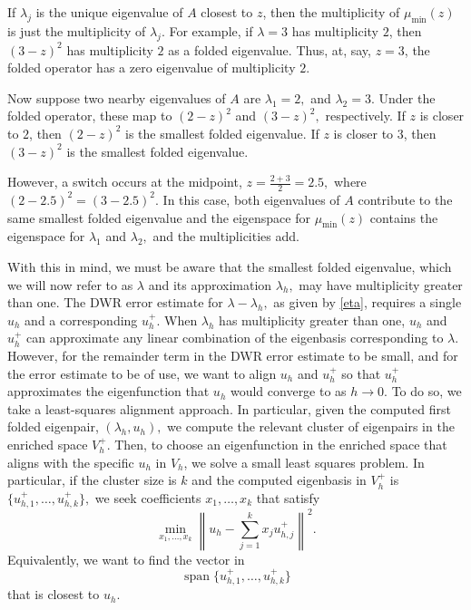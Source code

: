 \documentclass[12pt,a4paper]{article}
\theoremstyle{boldthm}
\theoremstyle{bolddefn}
\begin{document}
If $\lambda_j$ is the unique eigenvalue of $A$ closest to $z$, then the
multiplicity of $\mu_{\min}(z)$ is just the multiplicity of $\lambda_j$.
For example, if $\lambda=3$ has multiplicity $2$, then $(3-z)^2$
has multiplicity $2$ as a folded eigenvalue. Thus, at, say, $z=3$, the
folded operator has a zero eigenvalue of multiplicity $2$.

Now suppose two nearby eigenvalues of $A$ are $\lambda_1=2,$ and $\lambda_2 = 3.$
Under the folded operator, these map to $(2-z)^2$ and $(3-z)^2,$ respectively.
If $z$ is closer to $2$, then $(2-z)^2$ is the smallest folded eigenvalue. If
$z$ is closer to $3$, then $(3-z)^2$ is the smallest folded eigenvalue.

However, a switch occurs at the midpoint, $z = \frac{2+3}{2} = 2.5,$ where
$(2-2.5)^2 = (3-2.5)^2.$
In this case, both eigenvalues of $A$ contribute to the same smallest folded eigenvalue and the eigenspace for $\mu_{\min}(z)$ contains the eigenspace for $\lambda_1$ and $\lambda_2,$ and the multiplicities add.

With this in mind, we must be aware that the smallest folded eigenvalue, which we will now refer to as $\lambda$ and its approximation $\lambda_h,$ may have multiplicity greater than one. The DWR error estimate for $\lambda - \lambda_h,$ as given by \eqref{eta}, requires a single $u_h$ and a corresponding $u_h^+.$ When $\lambda_h$ has multiplicity greater than one, $u_h$ and $u_h^+$ can approximate any linear combination of the eigenbasis corresponding to $\lambda.$ However, for the remainder term in the DWR error estimate to be small, and for the error estimate to be of use, we want to align $u_h$ and $u_h^+$ so that $u_h^+$ approximates the eigenfunction that $u_h$ would converge to as $h\rightarrow 0.$ To do so, we take a least-squares alignment approach. In particular, given the computed first folded eigenpair, $(\lambda_h, u_h),$ we compute the relevant cluster of eigenpairs in the enriched space $V_h^+.$ Then, to choose an eigenfunction in the enriched space that aligns with the specific $u_h$ in $V_h$, we solve a small least squares problem. In particular, if the cluster size is $k$ and the computed eigenbasis in $V_h^+$ is $\{u^+_{h,1},\ldots,u^+_{h,k}\},$ we seek coefficients \(x_1,\ldots,x_k\) that satisfy
\begin{equation}
    \min_{x_1,\ldots,x_k}
    \left\| u_h - \sum_{j=1}^k x_j u^+_{h,j} \right\|^2.
\end{equation}
Equivalently, we want to find the vector in
\begin{equation}
    \operatorname{span}\{u^+_{h,1},\ldots,u^+_{h,k}\}
\end{equation}
that is closest to \(u_h\). 
\end{document}
